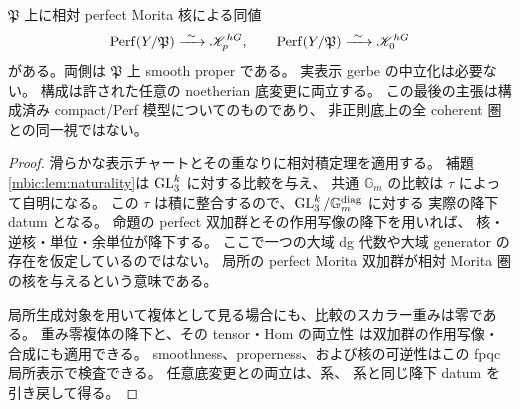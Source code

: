\begin{theorem}[射影的表示上の実際の積核]
\label{mbic:thm:projective-product}
$\mathfrak P$ 上に相対 perfect Morita 核による同値
\begin{equation}\label{mbic:eq:projective-product}
 \operatorname{Perf}(Y/\mathfrak P)
   \xrightarrow{\ \sim\ }\mathscr K_p^{hG},
 \qquad
 \operatorname{Perf}(Y/\mathfrak P)
   \xrightarrow{\ \sim\ }\mathscr K_0^{hG}
\end{equation}
がある。両側は $\mathfrak P$ 上 smooth proper である。
実表示 gerbe の中立化は必要ない。
構成は許された任意の noetherian 底変更に両立する。
この最後の主張は構成済み compact/Perf 模型についてのものであり、
非正則底上の全 coherent 圏との同一視ではない。
\end{theorem}
\begin{proof}
滑らかな表示チャートとその重なりに相対積定理を適用する。
補題\ref{mbic:lem:naturality}は $\operatorname{GL}_3^k$ に対する比較を与え、
共通 $\mathbb G_m$ の比較は $\tau$ によって自明になる。
この $\tau$ は積に整合するので、$\operatorname{GL}_3^k/\mathbb G_m^{\mathrm{diag}}$ に対する
実際の降下 datum となる。
命題の perfect 双加群とその作用写像の降下を用いれば、
核・逆核・単位・余単位が降下する。
ここで一つの大域 dg 代数や大域 generator の存在を仮定しているのではない。
局所の perfect Morita 双加群が相対 Morita 圏の核を与えるという意味である。

局所生成対象を用いて複体として見る場合にも、比較のスカラー重みは零である。
重み零複体の降下と、その tensor・Hom の両立性
\cite[Proposition~5.7, Corollary~5.9]{NFMBerghSchnurer}
は双加群の作用写像・合成にも適用できる。
smoothness、properness、および核の可逆性はこの fpqc 局所表示で検査できる。
任意底変更との両立は、系、
系と同じ降下 datum を引き戻して得る。
\end{proof}

